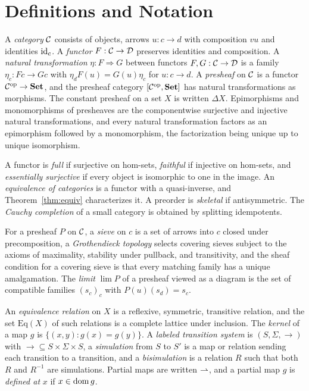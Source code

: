 \appendix

\section{Definitions and Notation}

A \emph{category} $\mathcal C$ consists of objects, arrows $u:c\to d$ with composition $vu$ and identities $\mathrm{id}_c$. A \emph{functor} $F:\mathcal C\to\mathcal D$ preserves identities and composition. A \emph{natural transformation} $\eta:F\Rightarrow G$ between functors $F,G:\mathcal C\to\mathcal D$ is a family $\eta_c:Fc\to Gc$ with $\eta_dF(u)=G(u)\eta_c$ for $u:c\to d$. A \emph{presheaf} on $\mathcal C$ is a functor $\mathcal C^{\mathrm{op}}\to\mathbf{Set}$, and the presheaf category $[\mathcal C^{\mathrm{op}},\mathbf{Set}]$ has natural transformations as morphisms. The constant presheaf on a set $X$ is written $\Delta X$. Epimorphisms and monomorphisms of presheaves are the componentwise surjective and injective natural transformations, and every natural transformation factors as an epimorphism followed by a monomorphism, the factorization being unique up to unique isomorphism.

A functor is \emph{full} if surjective on hom-sets, \emph{faithful} if injective on hom-sets, and \emph{essentially surjective} if every object is isomorphic to one in the image. An \emph{equivalence of categories} is a functor with a quasi-inverse, and Theorem~\ref{thm:equiv} characterizes it. A preorder is \emph{skeletal} if antisymmetric. The \emph{Cauchy completion} of a small category is obtained by splitting idempotents.

For a presheaf $P$ on $\mathcal C$, a \emph{sieve} on $c$ is a set of arrows into $c$ closed under precomposition, a \emph{Grothendieck topology} selects covering sieves subject to the axioms of maximality, stability under pullback, and transitivity, and the sheaf condition for a covering sieve is that every matching family has a unique amalgamation. The \emph{limit} $\lim P$ of a presheaf viewed as a diagram is the set of compatible families $(s_c)_c$ with $P(u)(s_d)=s_c$.

An \emph{equivalence relation} on $X$ is a reflexive, symmetric, transitive relation, and the set $\mathrm{Eq}(X)$ of such relations is a complete lattice under inclusion. The \emph{kernel} of a map $g$ is $\{(x,y):g(x)=g(y)\}$. A \emph{labeled transition system} is $(S,\Sigma,\to)$ with $\to\subseteq S\times\Sigma\times S$, a \emph{simulation} from $S$ to $S'$ is a map or relation sending each transition to a transition, and a \emph{bisimulation} is a relation $R$ such that both $R$ and $R^{-1}$ are simulations. Partial maps are written $\rightharpoonup$, and a partial map $g$ is \emph{defined at} $x$ if $x\in\operatorname{dom} g$.

